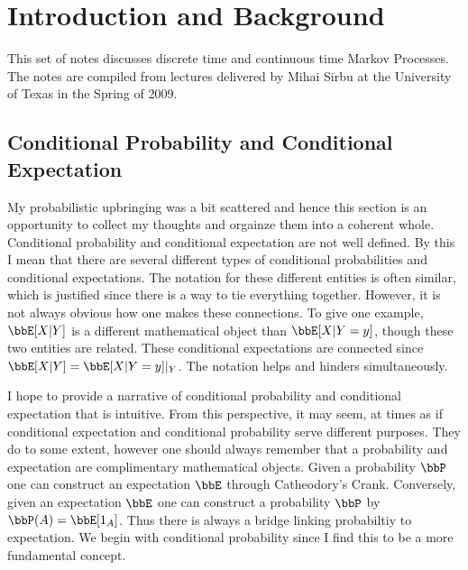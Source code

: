 \documentclass{report}
\begin{document}
\large %
\linespread{1.1} %

\setcounter{section}{0}

\tableofcontents

\chapter{Introduction and Background}

This set of notes discusses discrete time and continuous time Markov Processes.  The notes are compiled from lectures delivered by Mihai Sirbu at the University of Texas in the Spring of 2009.

\section{Conditional Probability and Conditional Expectation}

My probabilistic upbringing was a bit scattered and hence this section is an opportunity to collect my thoughts and orgainze them into a coherent whole.  Conditional probability and conditional expectation are not well defined.  By this I mean that there are several different types of conditional probabilities and conditional expectations.  The notation for these different entities is often similar, which is justified since there is a way to tie everything together.  However, it is not always obvious how one makes these connections.  To give one example, $\bbE[X | Y]$ is a different mathematical object than $\bbE[X | Y = y]$, though these two entities are related.  These conditional expectations are connected since $\bbE[X|Y] = \bbE[X|Y=y]|_{Y}$.  The notation helps and hinders simultaneously.

I hope to provide a narrative of conditional probability and conditional expectation that is intuitive.  From this perspective, it may seem, at times as if conditional expectation and conditional probability serve different purposes.  They do to some extent, however one should always remember that a probability and expectation are complimentary mathematical objects.  Given a probability $\bbP$ one can construct an expectation $\bbE$ through Catheodory's Crank.  Conversely, given an expectation $\bbE$ one can construct a probability $\bbP$ by $\bbP(A) = \bbE[1_A]$.  Thus there is always a bridge linking probabiltiy to expectation.  We begin with conditional probability since I find this to be a more fundamental concept.
\end{document}
